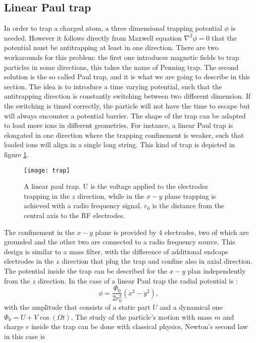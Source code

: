 \subsection{Linear Paul trap}
In order to trap a charged atom, a three dimensional trapping potential $\phi$ is needed. However it follows directly from Maxwell equation $\nabla^2 \phi = 0$ that the potential must be antitrapping at least in one direction. There are two workarounds for this problem: the first one introduces magnetic fields to trap particles in some directions, this takes the name of Penning trap. The second solution is the so called Paul trap, and it is what we are going to describe in this section. The idea is to introduce a time varying potential, such that the antitrapping direction is constantly switching between two  different dimension. If the switching is timed correctly, the particle will not have the time to escape but will always encounter a potential barrier.
The shape of the trap can be adapted to load more ions in different geometries. For instance, a linear Paul trap is elongated in one direction where the trapping confinement is weaker, such that loaded ions will align in a single long string. This kind of trap is depicted in figure \ref{trap}.
\begin{figure}[H]
\centering
\texttt{[image: trap]}
\caption{A linear paul trap. U is the voltage applied to the electrodes trapping in the $z$ direction, while in the $x-y$ plane trapping is achieved with a radio frequency signal. $r_0$ is the distance from the central axis to the RF electrodes.}
\label{trap}
\end{figure}
The confinement in the $x-y$ plane is provided by 4 electrodes, two of which are grounded and the other two are connected to a radio frequency source. This design is similar to a mass filter, with the difference of additional endcaps electrodes in the $z$ direction that plug the trap and confine also in axial direction.\\
The potential inside the trap can be described for the $x-y$ plan independently from the $z$ direction. In the case of a linear Paul trap the radial potential is \cite{traptheory}:
\begin{equation}
\phi  = \frac{\Phi_0}{2r_0^2}\left(x^2 - y^2\right),
\end{equation}
with the amplitude that consists of a static part $U$ and a dynamical one $\Phi_0 = U + V \cos(\Omega t)$.
The study of the particle's motion with mass $m$ and charge $e$ inside the trap can be done with classical physics, Newton's second law in this case is
